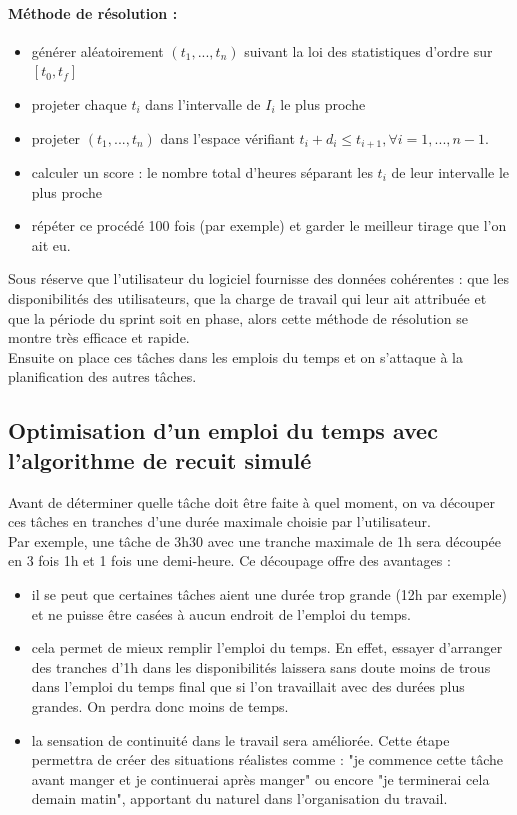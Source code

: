 \documentclass[12pt]{article}
\begin{document}
\paragraph{Méthode de résolution :}
\begin{itemize}
\item générer aléatoirement $(t_1,...,t_n)$ suivant la loi des statistiques d'ordre sur $[t_0,t_f]$
\item projeter chaque $t_i$ dans l'intervalle de $I_i$ le plus proche
\item projeter $(t_1,...,t_n)$ dans l'espace vérifiant $t_i + d_i \leq t_{i+1}, \forall i = 1,...,n-1$.
\item calculer un score : le nombre total d'heures séparant les $t_i$ de leur intervalle le plus proche
\item répéter ce procédé 100 fois (par exemple) et garder le meilleur tirage que l'on ait eu.\\
\end{itemize}

Sous réserve que l'utilisateur du logiciel fournisse des données cohérentes : que les disponibilités des utilisateurs,
que la charge de travail qui leur ait attribuée et que la période du sprint soit en phase, alors cette méthode de résolution se montre très efficace et rapide.\\

Ensuite on place ces tâches dans les emplois du temps et on s'attaque à la planification des autres tâches.
\newpage
\subsection{Optimisation d'un emploi du temps avec l'algorithme de recuit simulé}
Avant de déterminer quelle tâche doit être faite à quel moment, on va découper ces tâches en tranches d'une durée maximale choisie par l'utilisateur.\\
Par exemple, une tâche de 3h30 avec une tranche maximale de 1h sera découpée en 3 fois 1h et 1 fois une demi-heure.
Ce découpage offre des avantages :
\begin{itemize}
\item il se peut que certaines tâches aient une durée trop grande (12h par exemple) et ne puisse être casées à aucun endroit de l'emploi du temps.
\item cela permet de mieux remplir l'emploi du temps. En effet, essayer d'arranger des tranches d'1h dans les disponibilités laissera sans doute moins de trous dans l'emploi du temps final que si l'on travaillait avec des durées plus grandes. On perdra donc moins de temps.
\item la sensation de continuité dans le travail sera améliorée. Cette étape permettra de créer des situations réalistes comme : "je commence cette tâche avant manger et je continuerai après manger" ou encore "je terminerai cela demain matin", apportant du naturel dans l'organisation du travail.
\end{itemize}
\end{document}
